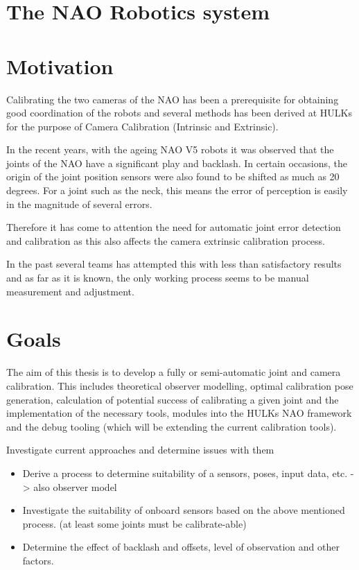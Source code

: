 \documentclass[english, printversion, nomenclature, notitle]{tuvisionthesis} %
\begin{document}
\section{The NAO Robotics system}


\section{Motivation}

Calibrating the two cameras of the NAO has been a prerequisite for obtaining good coordination of the robots and several methods has been derived at HULKs for the purpose of Camera Calibration (Intrinsic and Extrinsic).

In the recent years, with the ageing NAO V5 robots it was observed that the joints of the NAO have a significant play and backlash. In certain occasions, the origin of the joint position sensors were also found to be shifted as much as 20 degrees. For a joint such as the neck, this means the error of perception is easily in the magnitude of several errors.

Therefore it has come to attention the need for automatic joint error detection and calibration as this also affects the camera extrinsic calibration process.

In the past several teams has attempted this with less than satisfactory results and as far as it is known, the only working process seems to be manual measurement and adjustment.

\section{Goals}
The aim of this thesis is to develop a fully or semi-automatic joint and camera calibration. This includes theoretical observer modelling, optimal calibration pose generation, calculation of potential success of calibrating a given joint and the implementation of the necessary tools, modules into the HULKs NAO framework and the debug tooling (which will be extending the current calibration tools).

Investigate current approaches and determine issues with them

\begin{itemize}
	\item Derive a process to determine suitability of a sensors, poses, input data, etc. -> also observer model
	\item Investigate the suitability of onboard sensors based on the above mentioned process. (at least some joints must be calibrate-able)
	\item Determine the effect of backlash and offsets, level of observation and other factors.
\end{itemize}
\end{document}
